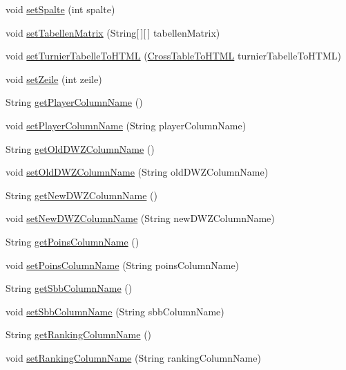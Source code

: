 \begin{DoxyCompactItemize}
void \hyperlink{classde_1_1turnierverwaltung_1_1model_1_1_cross_table_a761132f195f715b316619209f6e4baf9}{set\+Spalte} (int spalte)
\item 
void \hyperlink{classde_1_1turnierverwaltung_1_1model_1_1_cross_table_af4e77f45faae3982eeaece2e30699c9c}{set\+Tabellen\+Matrix} (String\mbox{[}$\,$\mbox{]}\mbox{[}$\,$\mbox{]} tabellen\+Matrix)
\item 
void \hyperlink{classde_1_1turnierverwaltung_1_1model_1_1_cross_table_a47441d3ea478985ee412cfb6e5982b7f}{set\+Turnier\+Tabelle\+To\+H\+T\+ML} (\hyperlink{classde_1_1turnierverwaltung_1_1model_1_1_cross_table_to_h_t_m_l}{Cross\+Table\+To\+H\+T\+ML} turnier\+Tabelle\+To\+H\+T\+ML)
\item 
void \hyperlink{classde_1_1turnierverwaltung_1_1model_1_1_cross_table_a58a6ab36faa3002d937dd4be97eec213}{set\+Zeile} (int zeile)
\item 
String \hyperlink{classde_1_1turnierverwaltung_1_1model_1_1_cross_table_a057ee8f38428d8286010024fed4280d1}{get\+Player\+Column\+Name} ()
\item 
void \hyperlink{classde_1_1turnierverwaltung_1_1model_1_1_cross_table_a005d48abe52d8359103e6c73626555c2}{set\+Player\+Column\+Name} (String player\+Column\+Name)
\item 
String \hyperlink{classde_1_1turnierverwaltung_1_1model_1_1_cross_table_af24eaf534019a08454ad9d9b12ff5f65}{get\+Old\+D\+W\+Z\+Column\+Name} ()
\item 
void \hyperlink{classde_1_1turnierverwaltung_1_1model_1_1_cross_table_ad11d82a36a3820fbc7de3ee70facbd98}{set\+Old\+D\+W\+Z\+Column\+Name} (String old\+D\+W\+Z\+Column\+Name)
\item 
String \hyperlink{classde_1_1turnierverwaltung_1_1model_1_1_cross_table_adb5d9f257b95b45d268da16337212280}{get\+New\+D\+W\+Z\+Column\+Name} ()
\item 
void \hyperlink{classde_1_1turnierverwaltung_1_1model_1_1_cross_table_a37eb9e394a57d0d1168b3e33919e6418}{set\+New\+D\+W\+Z\+Column\+Name} (String new\+D\+W\+Z\+Column\+Name)
\item 
String \hyperlink{classde_1_1turnierverwaltung_1_1model_1_1_cross_table_aa7bb958764f688218f8f1a970b304293}{get\+Poins\+Column\+Name} ()
\item 
void \hyperlink{classde_1_1turnierverwaltung_1_1model_1_1_cross_table_a6c84525871574b4fed172bff10a7db05}{set\+Poins\+Column\+Name} (String poins\+Column\+Name)
\item 
String \hyperlink{classde_1_1turnierverwaltung_1_1model_1_1_cross_table_a5caa872dab535a1318b1d71cedf86562}{get\+Sbb\+Column\+Name} ()
\item 
void \hyperlink{classde_1_1turnierverwaltung_1_1model_1_1_cross_table_acca7a2056314a25b5c7360e7681406e1}{set\+Sbb\+Column\+Name} (String sbb\+Column\+Name)
\item 
String \hyperlink{classde_1_1turnierverwaltung_1_1model_1_1_cross_table_a03a6567dd11dc0383b835afeed5c66db}{get\+Ranking\+Column\+Name} ()
\item 
void \hyperlink{classde_1_1turnierverwaltung_1_1model_1_1_cross_table_ad4f712db065517cb67dec5f440dab2b3}{set\+Ranking\+Column\+Name} (String ranking\+Column\+Name)
\end{DoxyCompactItemize}


